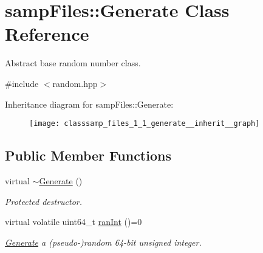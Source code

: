 \hypertarget{classsamp_files_1_1_generate}{}\section{samp\+Files\+:\+:Generate Class Reference}
\label{classsamp_files_1_1_generate}


Abstract base random number class.  




{\ttfamily \#include $<$random.\+hpp$>$}



Inheritance diagram for samp\+Files\+:\+:Generate\+:\nopagebreak
\begin{figure}[H]
\begin{center}
\leavevmode
\texttt{[image: classsamp\_files\_1\_1\_generate\_\_inherit\_\_graph]}
\end{center}
\end{figure}
\subsection*{Public Member Functions}
\begin{DoxyCompactItemize}
\item 
\mbox{\label{classsamp_files_1_1_generate_af3b922c99cbfafe9d27a0ceafb87243c}} 
virtual \hyperlink{classsamp_files_1_1_generate_af3b922c99cbfafe9d27a0ceafb87243c}{$\sim$\+Generate} ()
\begin{DoxyCompactList}\small\item\em Protected destructor. \end{DoxyCompactList}\item 
virtual volatile uint64\+\_\+t \hyperlink{classsamp_files_1_1_generate_a86fe4e68cc0809d4d936615fc60c125e}{ran\+Int} ()=0
\begin{DoxyCompactList}\small\item\em \hyperlink{classsamp_files_1_1_generate}{Generate} a (pseudo-\/)random 64-\/bit unsigned integer. \end{DoxyCompactList}\end{DoxyCompactItemize}
